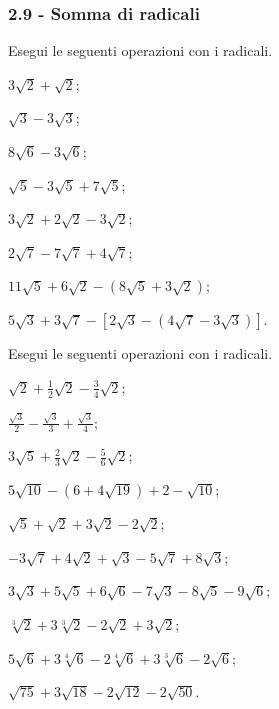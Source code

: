 \subsubsection*{2.9 - Somma di radicali}

\begin{esercizio}[\Ast]
 \label{ese:2.63}
Esegui le seguenti operazioni con i radicali.
 \begin{multicols}{2}
 \begin{enumeratea}
 \item $3\sqrt 2+\sqrt 2$;
 \item $\sqrt 3-3\sqrt 3$;
 \item $8\sqrt 6-3\sqrt 6$;
 \item $\sqrt 5-3\sqrt 5+7\sqrt 5$;
 \item $3\sqrt 2+2\sqrt 2-3\sqrt 2$;
 \item $2\sqrt 7-7\sqrt 7+4\sqrt 7$;
 \item $11\sqrt 5+6\sqrt 2-(8\sqrt 5+3\sqrt 2)$;
 \item $5\sqrt 3+3\sqrt 7-[2\sqrt 3-(4\sqrt 7-3\sqrt 3)]$.
 \end{enumeratea}
 \end{multicols}
\end{esercizio}

\begin{esercizio}[\Ast]
 \label{ese:2.64}
Esegui le seguenti operazioni con i radicali.
 \begin{multicols}{2}
 \begin{enumeratea}
 \item $\sqrt 2+\frac 1 2\sqrt 2-\frac 3 4\sqrt 2$;
 \item $\frac{\sqrt 3} 2-\frac{\sqrt 3} 3+\frac{\sqrt 3} 4$;
 \item $3\sqrt 5+\frac 2 3\sqrt 2-\frac 5 6\sqrt 2$;
 \item $5\sqrt{10}-\left(6+4\sqrt{19}\right)+2-\sqrt{10}$;
 \item $\sqrt 5+\sqrt 2+3\sqrt 2-2\sqrt 2$;
 \item $-3\sqrt 7+4\sqrt 2+\sqrt 3-5\sqrt 7+8\sqrt 3$;
 \item $3\sqrt 3+5\sqrt 5+6\sqrt 6-7\sqrt 3-8\sqrt 5-9\sqrt 6$;
 \item $\sqrt[3]2+3\sqrt[3]2-2\sqrt 2+3\sqrt 2$;
 \item $5\sqrt 6+3\sqrt[4]6-2\sqrt[4]6+3\sqrt[3]6-2\sqrt 6$;
 \item $\sqrt{75}+3\sqrt{18}-2\sqrt{12}-2\sqrt{50}$.
 \end{enumeratea}
 \end{multicols}
\end{esercizio}

